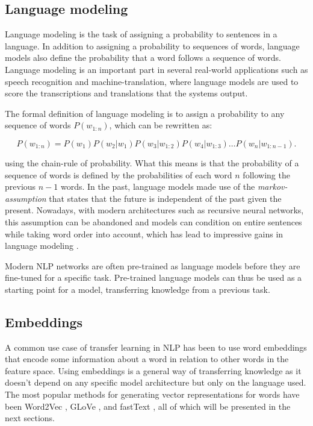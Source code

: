 \subsection{Language modeling}\label{Language modeling}
Language modeling is the task of assigning a probability to sentences in a language.
In addition to assigning a probability to sequences of words, language models also define the probability that a word follows a sequence of words.
Language modeling is an important part in several real-world applications such as speech recognition and machine-translation, where language models are used to score the transcriptions and translations that the systems output.

The formal definition of language modeling is to assign a probability to any sequence of words $P(w_{1:n})$, which can be rewritten as:

\begin{equation}
  P(w_{1:n})=P(w_1)P(w_2|w_1)P(w_3|w_{1:2})P(w_4|w_{1:3})\ldots{}P(w_n|w_{1:n-1}).
\end{equation}

using the chain-rule of probability.
What this means is that the probability of a sequence of words is defined by the probabilities of each word $n$ following the previous $n-1$ words.
In the past, language models made use of the \textit{markov-assumption} that states that the future is independent of the past given the present.
Nowadays, with modern architectures such as recursive neural networks, this assumption can be abandoned and models can condition on entire sentences while taking word order into account, which has lead to impressive gains in language modeling \cite{goldberg2017}.

Modern NLP networks are often pre-trained as language models before they are fine-tuned for a specific task.
Pre-trained language models can thus be used as a starting point for a model, transferring knowledge from a previous task.

\subsection{Embeddings} \label{Embeddings}
A common use case of transfer learning in NLP has been to use word embeddings that encode some information about a word in relation to other words in the feature space.
Using embeddings is a general way of transferring knowledge as it doesn't depend on any specific model architecture but only on the language used.
The most popular methods for generating vector representations for words have been Word2Vec \cite{mikolov2013}, GLoVe \cite{pennington2014}, and fastText \cite{bojanowski2017}, all of which will be presented in the next sections.

